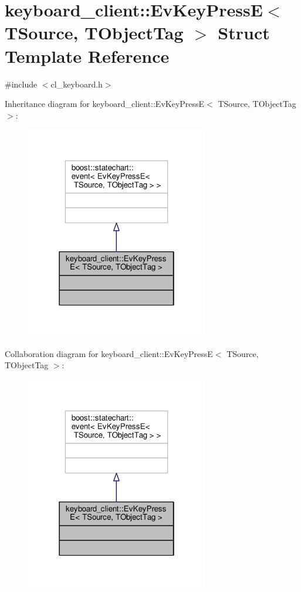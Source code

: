 \hypertarget{structkeyboard__client_1_1EvKeyPressE}{}\section{keyboard\+\_\+client\+:\+:Ev\+Key\+PressE$<$ T\+Source, T\+Object\+Tag $>$ Struct Template Reference}
\label{structkeyboard__client_1_1EvKeyPressE}


{\ttfamily \#include $<$cl\+\_\+keyboard.\+h$>$}



Inheritance diagram for keyboard\+\_\+client\+:\+:Ev\+Key\+PressE$<$ T\+Source, T\+Object\+Tag $>$\+:\nopagebreak
\begin{figure}[H]
\begin{center}
\leavevmode
\includegraphics[width=226pt]{structkeyboard__client_1_1EvKeyPressE__inherit__graph}
\end{center}
\end{figure}


Collaboration diagram for keyboard\+\_\+client\+:\+:Ev\+Key\+PressE$<$ T\+Source, T\+Object\+Tag $>$\+:\nopagebreak
\begin{figure}[H]
\begin{center}
\leavevmode
\includegraphics[width=226pt]{structkeyboard__client_1_1EvKeyPressE__coll__graph}
\end{center}
\end{figure}


